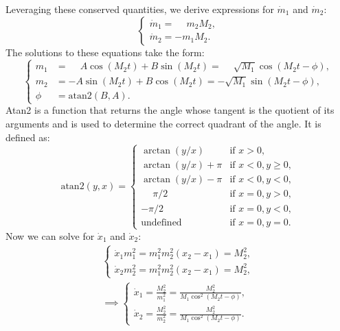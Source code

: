 \documentclass[english,master]{liumaiex}
\theoremstyle{plain}
\theoremstyle{definition}
\begin{document}
%
Leveraging these conserved quantities, we derive expressions for $\dot{m}_1$ and $\dot{m}_2$:
\begin{equation}
\left\{ \begin{aligned}
	\dot{m}_1 = \phantom{-}m_2M_2, \\
	\dot{m}_2 = -m_1M_2.
\end{aligned} \right.
\end{equation}
%
The solutions to these equations take the form:
\begin{equation}
\left\{ \begin{aligned}
	m_1 &= \phantom{-}A \cos(M_2t) + B\sin(M_2t) = \phantom{-}\sqrt{M_1} \cos(M_2t - \phi), \\
	m_2 &= -A \sin(M_2t) + B\cos(M_2t) = -\sqrt{M_1} \sin(M_2t - \phi), \\
	\phi &= \text{atan2}(B, A).
\end{aligned} \right.
\end{equation}
Atan2 is a function that returns the angle whose tangent is the quotient of its arguments and is used to determine the correct quadrant of the angle. It is defined as:
\begin{equation}
	\text{atan2}(y, x) = \begin{cases}
		\arctan(y/x) & \text{if } x > 0, \\
		\arctan(y/x) + \pi & \text{if } x < 0, y \geq 0, \\
		\arctan(y/x) - \pi & \text{if } x < 0, y < 0, \\
		\phantom{-}\pi/2 & \text{if } x = 0, y > 0, \\
		-\pi/2 & \text{if } x = 0, y < 0, \\
		\text{undefined} & \text{if } x = 0, y = 0.
	\end{cases}
\end{equation}
%
Now we can solve for $\dot{x}_1$ and $\dot{x}_2$:
\begin{align}
\left\{ \begin{aligned}
	\dot{x}_1m_1^2 = m_1^2m_2^2(x_2 - x_1) = M_2^2, \\
	\dot{x}_2m_2^2 = m_1^2m_2^2(x_2 - x_1) = M_2^2,
\end{aligned} \right. \\
\implies \left\{ \begin{aligned}
	\dot{x}_1 = \frac{M_2^2}{m_1^2} = \frac{M_2^2}{M_1\cos^2(M_2t - \phi)}, \\
	\dot{x}_2 = \frac{M_2^2}{m_2^2} = \frac{M_2^2}{M_1\cos^2(M_2t - \phi)}.
\end{aligned} \right.
\end{align}
\end{document}
